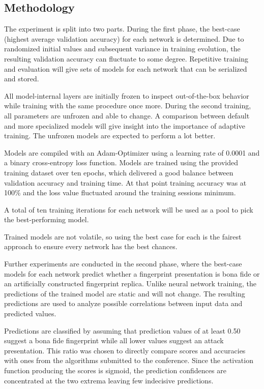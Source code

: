 


\subsection{Methodology}
The experiment is split into two parts.
During the first phase, the best-case (highest average validation accuracy) for each network is determined.
Due to randomized initial values and subsequent variance in training evolution, the resulting validation accuracy can fluctuate to some degree.
Repetitive training and evaluation will give sets of models for each network that can be serialized and stored.

All model-internal layers are initially frozen to inspect out-of-the-box behavior while training with the same procedure once more.
During the second training, all parameters are unfrozen and able to change.
A comparison between default and more specialized models will give insight into the importance of adaptive training.
The unfrozen models are expected to perform a lot better.

Models are compiled with an Adam-Optimizer using a learning rate of 0.0001 and a binary cross-entropy loss function.
Models are trained using the provided training dataset over ten epochs, which delivered a good balance between validation accuracy and training time.
At that point training accuracy was at 100\% and the loss value fluctuated around the training sessions minimum.

A total of ten training iterations for each network will be used as a pool to pick the best-performing model.

Trained models are not volatile, so using the best case for each is the fairest approach to ensure every network has the best chances.

Further experiments are conducted in the second phase, where the best-case models for each network predict whether a fingerprint presentation is bona fide or an artificially constructed fingerprint replica.
Unlike neural network training, the predictions of the trained model are static and will not change.
The resulting predictions are used to analyze possible correlations between input data and predicted values.

Predictions are classified by assuming that prediction values of at least 0.50 suggest a bona fide fingerprint while all lower values suggest an attack presentation.
This ratio was chosen to directly compare scores and accuracies with ones from the algorithms submitted to the conference. \cite{LIVDET}
Since the activation function producing the scores is sigmoid, the prediction confidences are concentrated at the two extrema leaving few indecisive predictions.

